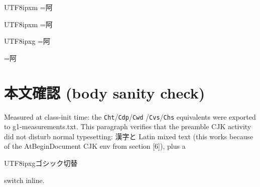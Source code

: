 \begin{CJK}{UTF8}{ipxm}%
\makeatletter
  \setbox\g@boxa=\hbox{阿}%
\end{CJK}
\AtEndDocument{\end{CJK}}

\begin{CJK}{UTF8}{ipxm}%
\makeatletter %
  \setbox\g@boxa=\hbox{阿}%
  \begin{CJK}{UTF8}{ipxg}
    \makeatletter
    \setbox\g@boxa=\hbox{阿}%
    \makeatother
  \end{CJK}
  \makeatletter
  \setbox\g@boxa=\hbox{阿}%
\end{CJK}

\immediate\closeout\g@log

\makeatother



\section{本文確認 (body sanity check)}

Measured at class-init time: the \texttt{Cht}/\texttt{Cdp}/\texttt{Cwd}%
/\texttt{Cvs}/\texttt{Chs} equivalents were exported to
g1-measurements.txt. This paragraph verifies that the preamble CJK activity
did not disturb normal typesetting: 漢字と Latin mixed text (this works
because of the AtBeginDocument CJK env from section [6]), plus a
\begin{CJK}{UTF8}{ipxg}ゴシック切替\end{CJK} switch inline.

